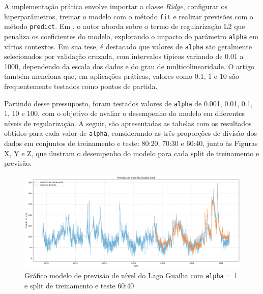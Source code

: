 A implementação prática envolve importar a classe \textit{Ridge}, configurar os hiperparâmetros, treinar o modelo com o método \texttt{fit} e realizar previsões com o método \texttt{predict}. Em \cite{Hastie01102020}, o autor aborda sobre o termo de regularização L2 que penaliza os coeficientes do modelo, explorando o impacto do parâmetro \texttt{alpha} em vários contextos. Em sua tese, é destacado que valores de \texttt{alpha} são geralmente selecionados por validação cruzada, com intervalos típicos variando de 0.01 a 1000, dependendo da escala dos dados e do grau de multicolinearidade. O artigo também menciona que, em aplicações práticas, valores como 0.1, 1 e 10 são frequentemente testados como pontos de partida.

Partindo desse pressuposto, foram testados valores de \texttt{alpha} de 0.001, 0.01, 0.1, 1, 10 e 100, com o objetivo de avaliar o desempenho do modelo em diferentes níveis de regularização. A seguir, são apresentadas as tabelas com os resultados obtidos para cada valor de \texttt{alpha}, considerando as três proporções de divisão dos dados em conjuntos de treinamento e teste: 80:20, 70:30 e 60:40, junto às Figuras X, Y e Z, que ilustram o desempenho do modelo para cada split de treinamento e previsão.

\begin{figure}[H]
	\caption{\label{fig:comparacao_radiacao_nivel_rio}Gráfico modelo de previsão de nível do Lago Guaíba com \texttt{alpha} = 1 e split de treinamento e teste 60:40}
	\begin{center}
		\includegraphics[scale=0.35]{figuras/modelo_previsao_60_40.png}
	\end{center}
\end{figure}

